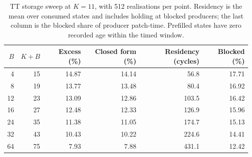 \begin{table}[htbp]
\centering\small
\begin{tabular}{rrrrrr}
\toprule
$B$ & $K+B$ & Excess (\%) & Closed form (\%) & Residency (cycles) & Blocked (\%)\\\midrule
4 & 15 & 14.87 & 14.14 & 56.8 & 17.71\\
8 & 19 & 13.77 & 13.48 & 80.4 & 16.92\\
12 & 23 & 13.09 & 12.86 & 103.5 & 16.42\\
16 & 27 & 12.48 & 12.33 & 126.9 & 15.96\\
24 & 35 & 11.38 & 11.05 & 174.7 & 15.13\\
32 & 43 & 10.43 & 10.22 & 224.6 & 14.41\\
64 & 75 & 7.93 & 7.88 & 431.1 & 12.42\\
\bottomrule
\end{tabular}
\caption{TT storage sweep at $K=11$, with 512 realisations per point. Residency is the mean over consumed states and includes holding at blocked producers; the last column is the blocked share of producer patch-time. Prefilled states have zero recorded age within the timed window.}
\label{tab:buffer}
\end{table}
